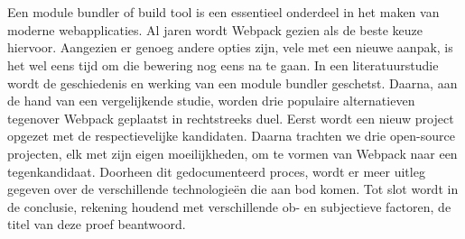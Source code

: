 
%
%

%



\chapter*{}
Een module bundler of build tool is een essentieel onderdeel in het maken van moderne webapplicaties. Al jaren wordt Webpack gezien als de beste keuze hiervoor. Aangezien er genoeg andere opties zijn, vele met een nieuwe aanpak, is het wel eens tijd om die bewering nog eens na te gaan. In een literatuurstudie wordt de geschiedenis en werking van een module bundler geschetst. Daarna, aan de hand van een vergelijkende studie, worden drie populaire alternatieven tegenover Webpack geplaatst in rechtstreeks duel. Eerst wordt een nieuw project opgezet met de respectievelijke kandidaten. Daarna trachten we drie open-source projecten, elk met zijn eigen moeilijkheden, om te vormen van Webpack naar een tegenkandidaat. Doorheen dit gedocumenteerd proces, wordt er meer uitleg gegeven over de verschillende technologieën die aan bod komen. Tot slot wordt in de conclusie, rekening houdend met verschillende ob- en subjectieve factoren, de titel van deze proef beantwoord. 

